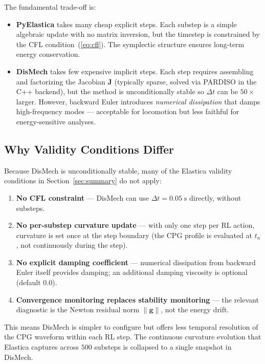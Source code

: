 \documentclass[11pt]{article}
\newcommand{\vect}[1]{\mathbf{#1}}
\newcommand{\mat}[1]{\mathbf{#1}}
\begin{document}
\noindent The fundamental trade-off is:

\begin{itemize}
  \item \textbf{PyElastica} takes many cheap explicit steps.  Each substep
        is a simple algebraic update with no matrix inversion, but the
        timestep is constrained by the CFL condition~(\ref{eq:cfl}).
        The symplectic structure ensures long-term energy conservation.
  \item \textbf{DisMech} takes few expensive implicit steps.  Each step
        requires assembling and factorizing the Jacobian $\mat{J}$
        (typically sparse, solved via PARDISO in the C++ backend), but
        the method is unconditionally stable so $\Delta t$ can be $50\times$
        larger.  However, backward Euler introduces \emph{numerical
        dissipation} that damps high-frequency modes --- acceptable for
        locomotion but less faithful for energy-sensitive analyses.
\end{itemize}

\subsection{Why Validity Conditions Differ}
\label{sec:why-differ}

Because DisMech is unconditionally stable, many of the Elastica validity
conditions in Section~\ref{sec:summary} do not apply:

\begin{enumerate}[nosep]
  \item \textbf{No CFL constraint} --- DisMech can use $\Delta t = 0.05\;\mathrm{s}$
        directly, without substeps.
  \item \textbf{No per-substep curvature update} --- with only one step per
        RL action, curvature is set once at the step boundary (the CPG
        profile is evaluated at $t_n$, not continuously during the step).
  \item \textbf{No explicit damping coefficient} --- numerical dissipation
        from backward Euler itself provides damping; an additional
        damping viscosity is optional (default $0.0$).
  \item \textbf{Convergence monitoring replaces stability monitoring} ---
        the relevant diagnostic is the Newton residual norm
        $\|\vect{g}\|$, not the energy drift.
\end{enumerate}

\noindent This means DisMech is simpler to configure but offers less
temporal resolution of the CPG waveform within each RL step.  The
continuous curvature evolution that Elastica captures across $500$
substeps is collapsed to a single snapshot in DisMech.
\end{document}
